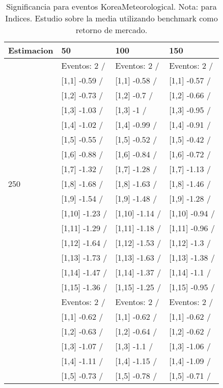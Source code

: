\begin{table}

\caption{Significancia para eventos KoreaMeteorological. Nota: para Indices. Estudio sobre la media utilizando benchmark como retorno de mercado.}
\centering
\begin{tabular}[t]{llll}
\toprule
Estimacion & 50 & 100 & 150\\
\midrule
 & Eventos:  2 / & Eventos:  2 / & Eventos:  2 /\\
 & {}[1,1] -0.59  / & {}[1,1] -0.58  / & {}[1,1] -0.57  /\\
 & {}[1,2] -0.73  / & {}[1,2] -0.7  / & {}[1,2] -0.66  /\\
 & {}[1,3] -1.03  / & {}[1,3] -1  / & {}[1,3] -0.95  /\\
 & {}[1,4] -1.02  / & {}[1,4] -0.99  / & {}[1,4] -0.91  /\\
\addlinespace
 & {}[1,5] -0.55  / & {}[1,5] -0.52  / & {}[1,5] -0.42  /\\
 & {}[1,6] -0.88  / & {}[1,6] -0.84  / & {}[1,6] -0.72  /\\
 & {}[1,7] -1.32  / & {}[1,7] -1.28  / & {}[1,7] -1.13  /\\
250 & {}[1,8] -1.68  / & {}[1,8] -1.63  / & {}[1,8] -1.46  /\\
 & {}[1,9] -1.54  / & {}[1,9] -1.48  / & {}[1,9] -1.28  /\\
\addlinespace
 & {}[1,10] -1.23  / & {}[1,10] -1.14  / & {}[1,10] -0.94  /\\
 & {}[1,11] -1.29  / & {}[1,11] -1.18  / & {}[1,11] -0.96  /\\
 & {}[1,12] -1.64  / & {}[1,12] -1.53  / & {}[1,12] -1.3  /\\
 & {}[1,13] -1.73  / & {}[1,13] -1.63  / & {}[1,13] -1.38  /\\
 & {}[1,14] -1.47  / & {}[1,14] -1.37  / & {}[1,14] -1.1  /\\
\addlinespace
 & {}[1,15] -1.36  / & {}[1,15] -1.25  / & {}[1,15] -0.95  /\\
 & Eventos:  2 / & Eventos:  2 / & Eventos:  2 /\\
 & {}[1,1] -0.62  / & {}[1,1] -0.62  / & {}[1,1] -0.62  /\\
 & {}[1,2] -0.63  / & {}[1,2] -0.64  / & {}[1,2] -0.62  /\\
 & {}[1,3] -1.07  / & {}[1,3] -1.1  / & {}[1,3] -1.06  /\\
\addlinespace
 & {}[1,4] -1.11  / & {}[1,4] -1.15  / & {}[1,4] -1.09  /\\
 & {}[1,5] -0.73  / & {}[1,5] -0.78  / & {}[1,5] -0.71  /\\

\end{tabular}
\end{table}
